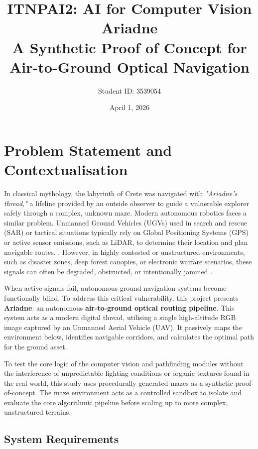 \documentclass[12pt, a4paper]{article}
\title{
    \Large \textbf{ITNPAI2: AI for Computer Vision} \\
    \vspace{0.5cm}
    \LARGE \textbf{Ariadne} \\
    \vspace{0.25cm}
    \large A Synthetic Proof of Concept for Air-to-Ground Optical Navigation
}
\author{Student ID: 3539054}
\date{April 1, 2026}
\begin{document}
\maketitle

\section{Problem Statement and Contextualisation}

\quad In classical mythology, the labyrinth of Crete was navigated with \textit{"Ariadne’s thread,"} a lifeline provided by an outside observer to guide a vulnerable explorer safely through a complex, unknown maze. Modern autonomous robotics faces a similar problem. Unmanned Ground Vehicles (UGVs) used in search and rescue (SAR) or tactical situations typically rely on Global Positioning Systems (GPS) or active sensor emissions, such as LiDAR, to determine their location and plan navigable routes. \cite{11219502}. However, in highly contested or unstructured environments, such as disaster zones, deep forest canopies, or electronic warfare scenarios, these signals can often be degraded, obstructed, or intentionally jammed \cite{8741612}.

\vspace{0.5cm}

When active signals fail, autonomous ground navigation systems become functionally blind. To address this critical vulnerability, this project presents \textbf{Ariadne}: an autonomous \textbf{air-to-ground optical routing pipeline}. This system acts as a modern digital thread, utilising a single high-altitude RGB image captured by an Unmanned Aerial Vehicle (UAV). It passively maps the environment below, identifies navigable corridors, and calculates the optimal path for the ground asset.

\vspace{0.5cm}

To test the core logic of the computer vision and pathfinding modules without the interference of unpredictable lighting conditions or organic textures found in the real world, this study uses procedurally generated mazes as a synthetic proof-of-concept. The maze environment acts as a controlled sandbox to isolate and evaluate the core algorithmic pipeline before scaling up to more complex, unstructured terrains.

\vspace{0.5cm}

\subsection{System Requirements}
\end{document}
